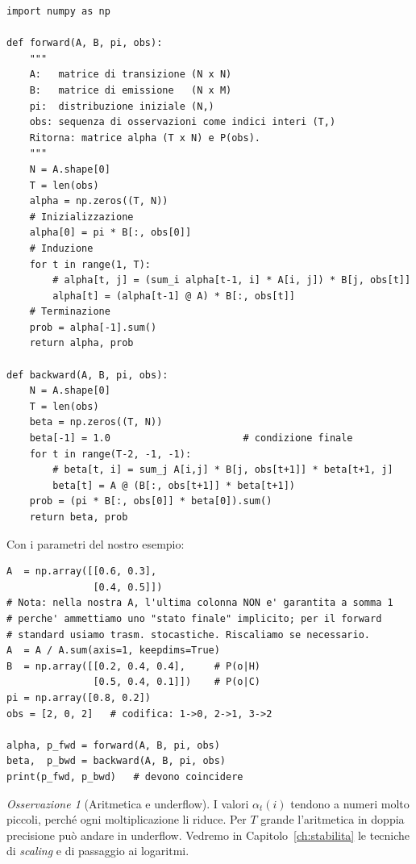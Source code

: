 \documentclass[11pt,a4paper,oneside]{book}
\theoremstyle{plain}
\theoremstyle{definition}
\theoremstyle{remark}
\newtheorem{osservazione}[teorema]{Osservazione}
\newcommand{\Tlen}{T}                        %
\newcommand{\fwd}{\alpha}                    %
\begin{document}
\begin{lstlisting}[caption={Forward e Backward in NumPy.}, label={lst:fwd_bwd}]
import numpy as np

def forward(A, B, pi, obs):
    """
    A:   matrice di transizione (N x N)
    B:   matrice di emissione   (N x M)
    pi:  distribuzione iniziale (N,)
    obs: sequenza di osservazioni come indici interi (T,)
    Ritorna: matrice alpha (T x N) e P(obs).
    """
    N = A.shape[0]
    T = len(obs)
    alpha = np.zeros((T, N))
    # Inizializzazione
    alpha[0] = pi * B[:, obs[0]]
    # Induzione
    for t in range(1, T):
        # alpha[t, j] = (sum_i alpha[t-1, i] * A[i, j]) * B[j, obs[t]]
        alpha[t] = (alpha[t-1] @ A) * B[:, obs[t]]
    # Terminazione
    prob = alpha[-1].sum()
    return alpha, prob

def backward(A, B, pi, obs):
    N = A.shape[0]
    T = len(obs)
    beta = np.zeros((T, N))
    beta[-1] = 1.0                       # condizione finale
    for t in range(T-2, -1, -1):
        # beta[t, i] = sum_j A[i,j] * B[j, obs[t+1]] * beta[t+1, j]
        beta[t] = A @ (B[:, obs[t+1]] * beta[t+1])
    prob = (pi * B[:, obs[0]] * beta[0]).sum()
    return beta, prob
\end{lstlisting}

Con i parametri del nostro esempio:

\begin{lstlisting}[caption={Test sull'HMM del gelato.}]
A  = np.array([[0.6, 0.3],
               [0.4, 0.5]])
# Nota: nella nostra A, l'ultima colonna NON e' garantita a somma 1
# perche' ammettiamo uno "stato finale" implicito; per il forward
# standard usiamo trasm. stocastiche. Riscaliamo se necessario.
A  = A / A.sum(axis=1, keepdims=True)
B  = np.array([[0.2, 0.4, 0.4],     # P(o|H)
               [0.5, 0.4, 0.1]])    # P(o|C)
pi = np.array([0.8, 0.2])
obs = [2, 0, 2]   # codifica: 1->0, 2->1, 3->2

alpha, p_fwd = forward(A, B, pi, obs)
beta,  p_bwd = backward(A, B, pi, obs)
print(p_fwd, p_bwd)   # devono coincidere
\end{lstlisting}

\begin{osservazione}[Aritmetica e underflow]
I valori $\fwd_t(i)$ tendono a numeri molto piccoli, perché ogni
moltiplicazione li riduce. Per $\Tlen$ grande l'aritmetica in doppia
precisione può andare in underflow. Vedremo in
Capitolo~\ref{ch:stabilita} le tecniche di \emph{scaling} e di passaggio
ai logaritmi.
\end{osservazione}
\end{document}
